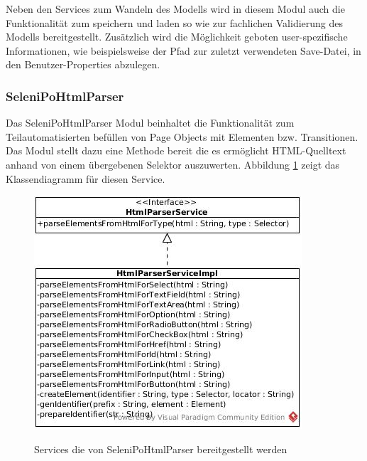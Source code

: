 Neben den Services zum Wandeln des Modells wird in diesem Modul auch die Funktionalität zum speichern und laden so wie zur fachlichen Validierung des Modells bereitgestellt.
Zusätzlich wird die Möglichkeit geboten user-spezifische Informationen, wie beispielsweise der Pfad zur zuletzt verwendeten Save-Datei, in den Benutzer-Properties abzulegen.


\subsubsection{SeleniPoHtmlParser}
\label{sec:selenipohtmlparser}

Das SeleniPoHtmlParser Modul beinhaltet die Funktionalität zum Teilautomatisierten befüllen von Page Objects mit Elementen bzw. Transitionen.
Das Modul stellt dazu eine Methode bereit die es ermöglicht HTML-Quelltext anhand von einem übergebenen Selektor auszuwerten.
Abbildung \ref{fig:html_service} zeigt das Klassendiagramm für diesen Service.

\begin{figure}[htb]
  \centering  
  \includegraphics[scale=0.5]{img/HtmlParserService.jpg}\\
  \caption{Services die von SeleniPoHtmlParser bereitgestellt werden}
  \label{fig:html_service}
\end{figure}

